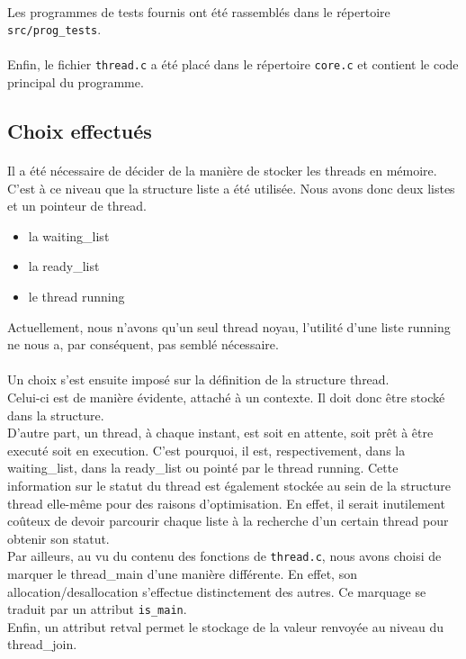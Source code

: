 \documentclass[a4paper]{article}
\begin{document}
\paragraph{}
Les programmes de tests fournis ont été rassemblés dans le répertoire \texttt{src/prog\_tests}.
\paragraph{}
Enfin, le fichier \texttt{thread.c} a été placé dans le répertoire \texttt{core.c} et contient le code principal du programme. 


\subsection{Choix effectués}
\paragraph{}
Il a été nécessaire de décider de la manière de stocker les threads en mémoire. C'est à ce niveau que la structure liste a été utilisée. Nous avons donc deux listes et un pointeur de thread.
\begin{itemize}
\item la waiting\_list
\item la ready\_list
\item le thread running
\end{itemize}
Actuellement, nous n'avons qu'un seul thread noyau, l'utilité d'une liste running ne nous a, par conséquent, pas semblé nécessaire.


\paragraph{}
Un choix s'est ensuite imposé sur la définition de la structure thread. \\
Celui-ci est de manière évidente, attaché à un contexte. Il doit donc être stocké dans la structure. \\
D'autre part, un thread, à chaque instant, est soit en attente, soit prêt à être executé soit en execution. C'est pourquoi, il est, respectivement, dans la waiting\_list, dans la ready\_list ou pointé par le thread running. Cette information sur le statut du thread est également stockée au sein de la structure thread elle-même pour des raisons d'optimisation. En effet, il serait inutilement coûteux de devoir parcourir chaque liste à la recherche d'un certain thread pour obtenir son statut. \\
Par ailleurs, au vu du contenu des fonctions de \texttt{thread.c}, nous avons choisi de marquer le thread\_main d'une manière différente. En effet, son allocation/desallocation s'effectue distinctement des autres. Ce marquage se traduit par un attribut \texttt{is\_main}. \\ 
Enfin, un attribut retval permet le stockage de la valeur renvoyée au niveau du thread\_join.
\end{document}
